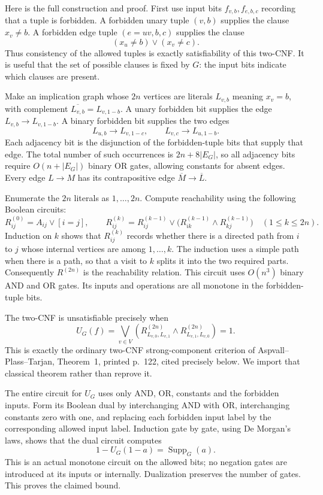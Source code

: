 Here is the full construction and proof.  First use input bits
$f_{v,b},f_{e,b,c}$ recording that a tuple is forbidden.  A forbidden
unary tuple $(v,b)$ supplies the clause $x_v\ne b$.  A forbidden edge
tuple $(e=uv,b,c)$ supplies the clause
\[
                       (x_u\ne b)\vee(x_v\ne c).
\]
Thus consistency of the allowed tuples is exactly satisfiability of
this two-CNF.  It is useful that the set of possible clauses is fixed
by $G$: the input bits indicate which clauses are present.

Make an implication graph whose $2n$ vertices are literals
$L_{v,b}$ meaning $x_v=b$, with complement
$\overline{L_{v,b}}=L_{v,1-b}$.  A unary forbidden bit supplies
the edge $L_{v,b}\to L_{v,1-b}$.  A binary forbidden bit supplies
the two edges
\[
 L_{u,b}\longrightarrow L_{v,1-c},\qquad
 L_{v,c}\longrightarrow L_{u,1-b}.
\]
Each adjacency bit is the disjunction of the forbidden-tuple bits
that supply that edge.  The total number of such occurrences is
$2n+8|E_G|$, so all adjacency bits require $O(n+|E_G|)$ binary
OR gates, allowing constants for absent edges.  Every edge
$L\to M$ has its contrapositive edge
$\overline M\to\overline L$.

Enumerate the $2n$ literals as $1,\ldots,2n$.  Compute reachability
using the following Boolean circuits:
\[
 R^{(0)}_{ij}=A_{ij}\vee[i=j],\qquad
 R^{(k)}_{ij}=R^{(k-1)}_{ij}\vee
             \bigl(R^{(k-1)}_{ik}\wedge R^{(k-1)}_{kj}\bigr)
                     \quad(1\le k\le2n).
\]
Induction on $k$ shows that $R^{(k)}_{ij}$ records whether there is
a directed path from $i$ to $j$ whose internal vertices are among
$1,\ldots,k$.  The induction uses a simple path when there is a
path, so that a visit to $k$ splits it into the two required parts.
Consequently $R^{(2n)}$ is the reachability relation.  This circuit
uses $O(n^3)$ binary AND and OR gates.  Its inputs and operations
are all monotone in the forbidden-tuple bits.

The two-CNF is unsatisfiable precisely when
\[
 U_G(f)=\bigvee_{v\in V}
 \left(R^{(2n)}_{L_{v,0},L_{v,1}}\wedge
       R^{(2n)}_{L_{v,1},L_{v,0}}\right)=1.
\]
This is exactly the ordinary two-CNF strong-component criterion of
Aspvall--Plass--Tarjan, Theorem~1, printed p.~122, cited precisely
below.  We import that classical theorem rather than reprove it.

The entire circuit for $U_G$ uses only AND, OR, constants and the
forbidden inputs.  Form its Boolean dual by interchanging AND with
OR, interchanging constants zero with one, and replacing each
forbidden input label by the corresponding allowed input label.
Induction gate by gate, using De Morgan's laws, shows that the
dual circuit computes
\[
                            1-U_G(1-a)=\operatorname{Supp}_G(a).
\]
This is an actual monotone circuit on the allowed bits; no negation
gates are introduced at its inputs or internally.  Dualization
preserves the number of gates.  This proves the claimed bound.

